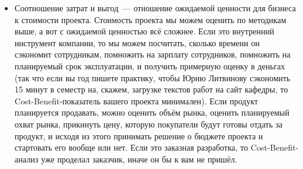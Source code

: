 \documentclass{../../text-style}
\begin{document}
\begin{itemize}
    \item Соотношение затрат и выгод~--- отношение ожидаемой ценности для бизнеса к стоимости проекта. Стоимость проекта мы можем оценить по методикам выше, а вот с ожидаемой ценностью всё сложнее. Если это внутренний инструмент компании, то мы можем посчитать, сколько времени он сэкономит сотрудникам, помножить на зарплату сотрудников, помножить на планируемый срок эксплуатации, и получить примерную оценку в деньгах (так что если вы год пишете практику, чтобы Юрию Литвинову сэкономить 15 минут в семестр на, скажем, загрузке текстов работ на сайт кафедры, то Cost-Benefit-показатель вашего проекта минимален). Если продукт планируется продавать, можно оценить объём рынка, оценить планируемый охват рынка, прикинуть цену, которую покупатели будут готовы отдать за продукт, и исходя из этого принимать решение о бюджете проекта и стартовать его вообще или нет. Если это заказная разработка, то Cost-Benefit-анализ уже проделал заказчик, иначе он бы к вам не пришёл.
    

\end{itemize}
\end{document}
